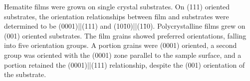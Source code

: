 Hematite  films were grown on single crystal  substrates. On (111)
oriented substrates, the orientation relationships between film and substrates were
determined to be (0001)||(111) and
(10\={1}0)||(1\={1}0). Polycrystalline films grew on (001) oriented
substrates. The film grains showed preferred orientations, falling into five orientation
groups. A portion grains were (0001) oriented, a second group was oriented with the (0001)
zone parallel to the sample surface, and a portion retained the
(0001)||(111) relationship, despite the (001) orientation of the
substrate.